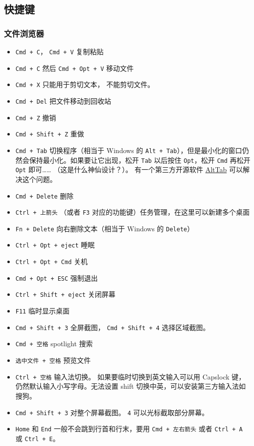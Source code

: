 \subsection{快捷键}

\subsubsection{文件浏览器}
\begin{itemize}
\item \verb|Cmd + C|， \verb|Cmd + V| 复制粘贴
\item \verb|Cmd + C| 然后 \verb|Cmd + Opt + V| 移动文件
\item \verb|Cmd + X| 只能用于剪切文本， 不能剪切文件。
\item \verb|Cmd + Del| 把文件移动到回收站
\item \verb|Cmd + Z| 撤销
\item \verb|Cmd + Shift + Z| 重做
\item \verb|Cmd + Tab| 切换程序（相当于 Windows 的 \verb`Alt + Tab`），但是最小化的窗口仍然会保持最小化。如果要让它出现，松开 \verb`Tab` 以后按住 \verb`Opt`，松开 \verb`Cmd` 再松开 \verb`Opt` 即可…… （这是什么神仙设计？）。 有一个第三方开源软件 \href{https://alt-tab-macos.netlify.app/}{AltTab} 可以解决这个问题。
\item \verb|Cmd + Delete| 删除
\item \verb`Ctrl + 上箭头` （或者 \verb`F3` 对应的功能键）任务管理，在这里可以新建多个桌面
\item \verb|Fn + Delete| 向右删除文本（相当于 Windows 的 \verb|Delete|）
\item \verb|Ctrl + Opt + eject| 睡眠
\item \verb|Ctrl + Opt + Cmd| 关机
\item \verb|Cmd + Opt + ESC| 强制退出
\item \verb|Ctrl + Shift + eject| 关闭屏幕
\item \verb|F11| 临时显示桌面
\item \verb|Cmd + Shift + 3| 全屏截图， \verb|Cmd + Shift + 4| 选择区域截图。
\item \verb|Cmd + 空格| spotlight 搜索
\item \verb|选中文件 + 空格| 预览文件
\item \verb|Ctrl + 空格| 输入法切换。 如果要临时切换到英文输入可以用 Capslock 键，仍然默认输入小写字母。无法设置 shift 切换中英，可以安装第三方输入法如搜狗。
\item \verb|Cmd + Shift + 3| 对整个屏幕截图。 \verb|4| 可以光标截取部分屏幕。
\item \verb|Home| 和 \verb|End| 一般不会跳到行首和行末，要用 \verb|Cmd + 左右箭头| 或者 \verb`Ctrl + A` 或 \verb`Ctrl + E`。
\end{itemize}

